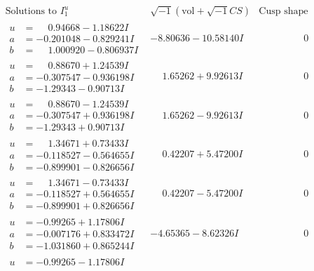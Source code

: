 \documentclass[1p]{elsarticle_modified}
\theoremstyle{definition}
\newcommand{\I}{\sqrt{-1}}
\begin{document}
$$\begin{array}{c|c|c}
\text{Solutions to }I^u_{1}& \I (\text{vol} + \sqrt{-1}CS) & \text{Cusp shape}\\
 \hline 
\begin{aligned}
u &= \phantom{-}0.94668 - 1.18622 I \\
a &= -0.201048 - 0.829241 I \\
b &= \phantom{-}1.000920 - 0.806937 I\end{aligned}
 & -8.80636 - 10.58140 I & \phantom{-0.000000 } 0 \\ \hline\begin{aligned}
u &= \phantom{-}0.88670 + 1.24539 I \\
a &= -0.307547 - 0.936198 I \\
b &= -1.29343 - 0.90713 I\end{aligned}
 & \phantom{-}1.65262 + 9.92613 I & \phantom{-0.000000 } 0 \\ \hline\begin{aligned}
u &= \phantom{-}0.88670 - 1.24539 I \\
a &= -0.307547 + 0.936198 I \\
b &= -1.29343 + 0.90713 I\end{aligned}
 & \phantom{-}1.65262 - 9.92613 I & \phantom{-0.000000 } 0 \\ \hline\begin{aligned}
u &= \phantom{-}1.34671 + 0.73433 I \\
a &= -0.118527 - 0.564655 I \\
b &= -0.899901 - 0.826656 I\end{aligned}
 & \phantom{-}0.42207 + 5.47200 I & \phantom{-0.000000 } 0 \\ \hline\begin{aligned}
u &= \phantom{-}1.34671 - 0.73433 I \\
a &= -0.118527 + 0.564655 I \\
b &= -0.899901 + 0.826656 I\end{aligned}
 & \phantom{-}0.42207 - 5.47200 I & \phantom{-0.000000 } 0 \\ \hline\begin{aligned}
u &= -0.99265 + 1.17806 I \\
a &= -0.007176 + 0.833472 I \\
b &= -1.031860 + 0.865244 I\end{aligned}
 & -4.65365 - 8.62326 I & \phantom{-0.000000 } 0 \\ \hline\begin{aligned}
u &= -0.99265 - 1.17806 I \\

\end{aligned}
\end{array}$$
\end{document}
